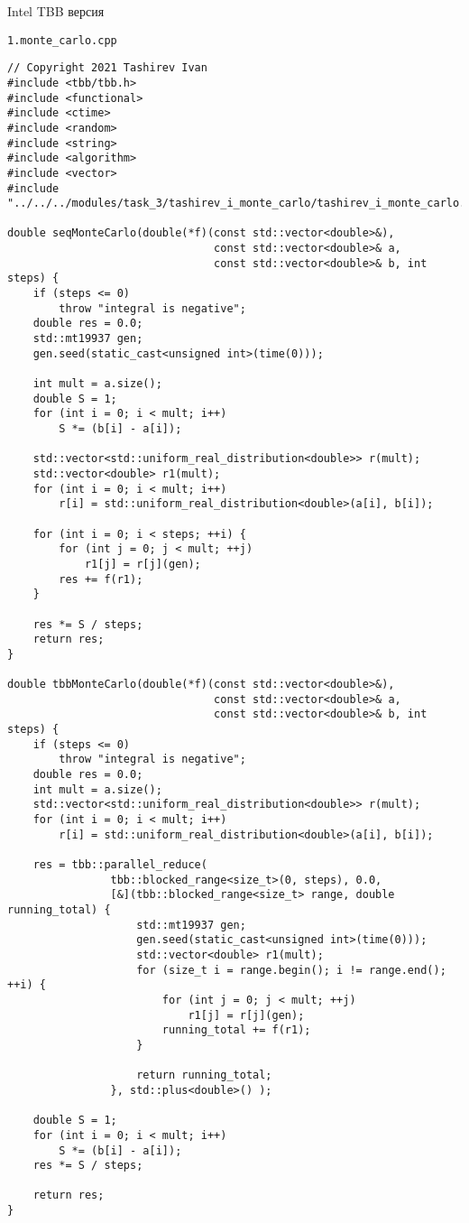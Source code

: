 \documentclass{report}
\begin{document}
\par Intel TBB версия
\par \verb|1.monte_carlo.cpp|
\begin{lstlisting}
// Copyright 2021 Tashirev Ivan
#include <tbb/tbb.h>
#include <functional>
#include <ctime>
#include <random>
#include <string>
#include <algorithm>
#include <vector>
#include "../../../modules/task_3/tashirev_i_monte_carlo/tashirev_i_monte_carlo.h"

double seqMonteCarlo(double(*f)(const std::vector<double>&),
                                const std::vector<double>& a,
                                const std::vector<double>& b, int steps) {
    if (steps <= 0)
        throw "integral is negative";
    double res = 0.0;
    std::mt19937 gen;
    gen.seed(static_cast<unsigned int>(time(0)));

    int mult = a.size();
    double S = 1;
    for (int i = 0; i < mult; i++)
        S *= (b[i] - a[i]);

    std::vector<std::uniform_real_distribution<double>> r(mult);
    std::vector<double> r1(mult);
    for (int i = 0; i < mult; i++)
        r[i] = std::uniform_real_distribution<double>(a[i], b[i]);

    for (int i = 0; i < steps; ++i) {
        for (int j = 0; j < mult; ++j)
            r1[j] = r[j](gen);
        res += f(r1);
    }

    res *= S / steps;
    return res;
}

double tbbMonteCarlo(double(*f)(const std::vector<double>&),
                                const std::vector<double>& a,
                                const std::vector<double>& b, int steps) {
    if (steps <= 0)
        throw "integral is negative";
    double res = 0.0;
    int mult = a.size();
    std::vector<std::uniform_real_distribution<double>> r(mult);
    for (int i = 0; i < mult; i++)
        r[i] = std::uniform_real_distribution<double>(a[i], b[i]);

    res = tbb::parallel_reduce(
                tbb::blocked_range<size_t>(0, steps), 0.0,
                [&](tbb::blocked_range<size_t> range, double running_total) {
                    std::mt19937 gen;
                    gen.seed(static_cast<unsigned int>(time(0)));
                    std::vector<double> r1(mult);
                    for (size_t i = range.begin(); i != range.end(); ++i) {
                        for (int j = 0; j < mult; ++j)
                            r1[j] = r[j](gen);
                        running_total += f(r1);
                    }

                    return running_total;
                }, std::plus<double>() );

    double S = 1;
    for (int i = 0; i < mult; i++)
        S *= (b[i] - a[i]);
    res *= S / steps;

    return res;
}
\end{lstlisting}
\end{document}
